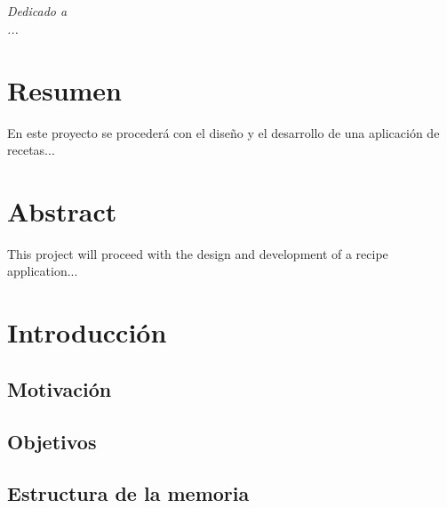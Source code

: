 \documentclass[twoside, openright, 11pt]{report}
\begin{document}
\chapter*{}
\begin{flushright}
\textit{Dedicado a \\
...}
\end{flushright}
\thispagestyle{empty}


\chapter*{Resumen} %
\thispagestyle{empty}
En este proyecto se procederá con el diseño y el desarrollo de una aplicación de recetas...

\chapter*{Abstract} %
\thispagestyle{empty}
This project will proceed with the design and development of a recipe application...

\tableofcontents %

\cleardoublepage
{} %
\listoffigures %

\cleardoublepage
{} %
\listoftables %

\chapter{Introducción}\label{cap.introduccion}
  \section{Motivación}
  
  \section{Objetivos}
  
  \section{Estructura de la memoria}
  
\end{document}
